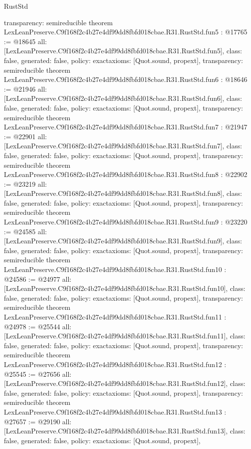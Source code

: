 \begin{lexlean}{RustStd}
\begin{coremodule}
{  transparency: semireducible
}
theorem LexLeanPreserve.C9f168f2c4b27e4df99dd8fbfd018cbae.R31.RustStd.fun5 : @17765 := @18645 {
  all: [LexLeanPreserve.C9f168f2c4b27e4df99dd8fbfd018cbae.R31.RustStd.fun5],
  class: false,
  generated: false,
  policy: exact{axioms: [Quot.sound, propext]},
  transparency: semireducible
}
theorem LexLeanPreserve.C9f168f2c4b27e4df99dd8fbfd018cbae.R31.RustStd.fun6 : @18646 := @21946 {
  all: [LexLeanPreserve.C9f168f2c4b27e4df99dd8fbfd018cbae.R31.RustStd.fun6],
  class: false,
  generated: false,
  policy: exact{axioms: [Quot.sound, propext]},
  transparency: semireducible
}
theorem LexLeanPreserve.C9f168f2c4b27e4df99dd8fbfd018cbae.R31.RustStd.fun7 : @21947 := @22901 {
  all: [LexLeanPreserve.C9f168f2c4b27e4df99dd8fbfd018cbae.R31.RustStd.fun7],
  class: false,
  generated: false,
  policy: exact{axioms: [Quot.sound, propext]},
  transparency: semireducible
}
theorem LexLeanPreserve.C9f168f2c4b27e4df99dd8fbfd018cbae.R31.RustStd.fun8 : @22902 := @23219 {
  all: [LexLeanPreserve.C9f168f2c4b27e4df99dd8fbfd018cbae.R31.RustStd.fun8],
  class: false,
  generated: false,
  policy: exact{axioms: [Quot.sound, propext]},
  transparency: semireducible
}
theorem LexLeanPreserve.C9f168f2c4b27e4df99dd8fbfd018cbae.R31.RustStd.fun9 : @23220 := @24585 {
  all: [LexLeanPreserve.C9f168f2c4b27e4df99dd8fbfd018cbae.R31.RustStd.fun9],
  class: false,
  generated: false,
  policy: exact{axioms: [Quot.sound, propext]},
  transparency: semireducible
}
theorem LexLeanPreserve.C9f168f2c4b27e4df99dd8fbfd018cbae.R31.RustStd.fun10 : @24586 := @24977 {
  all: [LexLeanPreserve.C9f168f2c4b27e4df99dd8fbfd018cbae.R31.RustStd.fun10],
  class: false,
  generated: false,
  policy: exact{axioms: [Quot.sound, propext]},
  transparency: semireducible
}
theorem LexLeanPreserve.C9f168f2c4b27e4df99dd8fbfd018cbae.R31.RustStd.fun11 : @24978 := @25544 {
  all: [LexLeanPreserve.C9f168f2c4b27e4df99dd8fbfd018cbae.R31.RustStd.fun11],
  class: false,
  generated: false,
  policy: exact{axioms: [Quot.sound, propext]},
  transparency: semireducible
}
theorem LexLeanPreserve.C9f168f2c4b27e4df99dd8fbfd018cbae.R31.RustStd.fun12 : @25545 := @27656 {
  all: [LexLeanPreserve.C9f168f2c4b27e4df99dd8fbfd018cbae.R31.RustStd.fun12],
  class: false,
  generated: false,
  policy: exact{axioms: [Quot.sound, propext]},
  transparency: semireducible
}
theorem LexLeanPreserve.C9f168f2c4b27e4df99dd8fbfd018cbae.R31.RustStd.fun13 : @27657 := @29190 {
  all: [LexLeanPreserve.C9f168f2c4b27e4df99dd8fbfd018cbae.R31.RustStd.fun13],
  class: false,
  generated: false,
  policy: exact{axioms: [Quot.sound, propext]},
}
\end{coremodule}
\end{lexlean}
